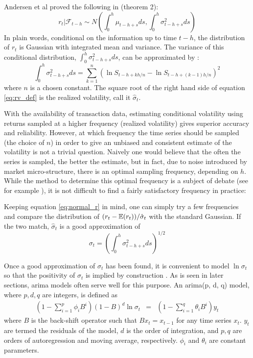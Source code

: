 \begin{enumerate}
Andersen et al proved the following in \cite{Andersen03} (theorem 2):
\begin{equation}
  \label{eq:normal_r}
  r_t|\mathcal{F}_{t-h} \sim N(\int_{0}^h \mu_{t-h+s} ds, \int_{0}^h
  \sigma_{t-h+s}^2 ds)
\end{equation}
In plain words, conditional on the information up to time $t-h$, the
distribution of $r_t$ is Gaussian with integrated mean and variance.
The variance of this conditional distribution, $\int_{0}^h
\sigma_{t-h+s}^2 ds$, can be approximated by \cite{Protter05,
  Andersen03}:
\begin{equation}
  \label{eq:rv_def}
  \int_{0}^h \sigma_{t-h+s}^2 ds = \sum_{k=1}^n \left(
    \ln S_{t-h+kh/n} - \ln S_{t-h+(k-1)h/n} \right)^2
\end{equation}
where $n$ is a chosen constant. The square root of the right hand side
of equation \ref{eq:rv_def} is the realized volatility, call it
$\hat{\sigma}_t$.

With the availability of transaction data, estimating conditional
volatility using returns sampled at a higher frequency (realized
volatility) gives superior accuracy and reliability. However, at which
frequency the time series should be sampled (the choice of $n$) in
order to give an unbiased and consistent estimate of the volatility is
not a trivial question. Naively one would believe that the often the
series is sampled, the better the estimate, but in fact, due to noise
introduced by market micro-structure, there is an optimal sampling
frequency, depending on $h$. While the method to determine this
optimal frequency is a subject of debate (see for example
\cite{Sahalia05}), it is not difficult to find a fairly satisfactory
frequency in practice:

Keeping equation \ref{eq:normal_r} in mind, one can simply try a few
frequencies and compare the distribution of $(r_t -
\mathbb{E}(r_t))/\hat{\sigma}_t$ with the standard Gaussian. If the two match,
$\hat{\sigma}_t$ is a good approximation of
\[
\sigma_t = \left(\int_{0}^h \sigma_{t-h+s}^2 ds \right)^{1/2}
\]

Once a good approximation of $\sigma_t$ has been found, it is
convenient to model $\ln\sigma_t$ so that the positivity of $\sigma_t$
is implied by construction \cite{Mikosch2009}. As is seen in later
sections, \gls{arima} models often serve well for this purpose. An
\gls{arima}(p, d, q) model, where $p,d,q$ are integers, is defined as
\cite{BoxJenkins94}
\begin{eqnarray*}
  (1 - \sum_{i=1}^p \phi_i B^i) (1 - B)^d \ln \sigma_t &=& (1 -
  \sum_{i=1}^q \theta_i B^i) y_t
\end{eqnarray*}
where $B$ is the back-shift operator such that $B x_t = x_{t-1}$ for
any time series $x_t$. $y_t$ are termed the residuals of the
model, $d$ is the order of integration, and $p, q$  are orders of
autoregression and moving average, respectively. $\phi_i$ and
$\theta_i$ are constant parameters.


\end{enumerate}
